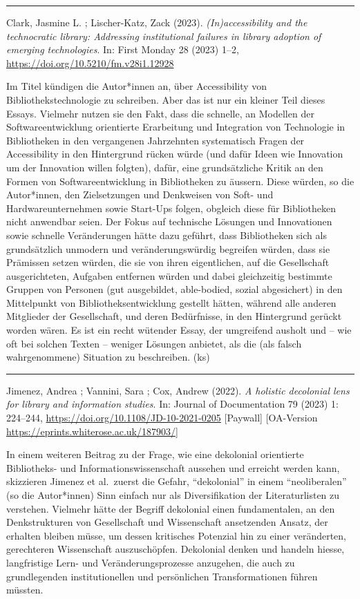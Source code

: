 \documentclass[a4paper,
fontsize=11pt,
oneside,
numbers=noperiodatend,
parskip=half-,
bibliography=totoc,
final
]{scrartcl}
\begin{document}
\begin{center}\rule{0.5\linewidth}{0.5pt}\end{center}

Clark, Jasmine L. ; Lischer-Katz, Zack (2023). \emph{(In)accessibility
and the technocratic library: Addressing institutional failures in
library adoption of emerging technologies}. In: First Monday 28 (2023)
1--2, \url{https://doi.org/10.5210/fm.v28i1.12928}

Im Titel kündigen die Autor*innen an, über Accessibility von
Bibliothekstechnologie zu schreiben. Aber das ist nur ein kleiner Teil
dieses Essays. Vielmehr nutzen sie den Fakt, dass die schnelle, an
Modellen der Softwareentwicklung orientierte Erarbeitung und Integration
von Technologie in Bibliotheken in den vergangenen Jahrzehnten
systematisch Fragen der Accessibility in den Hintergrund rücken würde
(und dafür Ideen wie Innovation um der Innovation willen folgten),
dafür, eine grundsätzliche Kritik an den Formen von Softwareentwicklung
in Bibliotheken zu äussern. Diese würden, so die Autor*innen, den
Zielsetzungen und Denkweisen von Soft- und Hardwareunternehmen sowie
Start-Ups folgen, obgleich diese für Bibliotheken nicht anwendbar seien.
Der Fokus auf technische Lösungen und Innovationen sowie schnelle
Veränderungen hätte dazu geführt, dass Bibliotheken sich als
grundsätzlich unmodern und veränderungswürdig begreifen würden, dass sie
Prämissen setzen würden, die sie von ihren eigentlichen, auf die
Gesellschaft ausgerichteten, Aufgaben entfernen würden und dabei
gleichzeitig bestimmte Gruppen von Personen (gut ausgebildet,
able-bodied, sozial abgesichert) in den Mittelpunkt von
Bibliotheksentwicklung gestellt hätten, während alle anderen Mitglieder
der Gesellschaft, und deren Bedürfnisse, in den Hintergrund gerückt
worden wären. Es ist ein recht wütender Essay, der umgreifend ausholt
und -- wie oft bei solchen Texten -- weniger Lösungen anbietet, als die
(als falsch wahrgenommene) Situation zu beschreiben. (ks)

\begin{center}\rule{0.5\linewidth}{0.5pt}\end{center}

Jimenez, Andrea ; Vannini, Sara ; Cox, Andrew (2022). \emph{A holistic
decolonial lens for library and information studies}. In: Journal of
Documentation 79 (2023) 1: 224--244,
\url{https://doi.org/10.1108/JD-10-2021-0205} {[}Paywall{]}
{[}OA-Version \url{https://eprints.whiterose.ac.uk/187903/}{]}

In einem weiteren Beitrag zu der Frage, wie eine dekolonial orientierte
Bibliotheks- und Informationswissenschaft aussehen und erreicht werden
kann, skizzieren Jimenez et al.~zuerst die Gefahr, \enquote{dekolonial}
in einem \enquote{neoliberalen} (so die Autor*innen) Sinn einfach nur
als Diversifikation der Literaturlisten zu verstehen. Vielmehr hätte der
Begriff dekolonial einen fundamentalen, an den Denkstrukturen von
Gesellschaft und Wissenschaft ansetzenden Ansatz, der erhalten bleiben
müsse, um dessen kritisches Potenzial hin zu einer veränderten,
gerechteren Wissenschaft auszuschöpfen. Dekolonial denken und handeln
hiesse, langfristige Lern- und Veränderungsprozesse anzugehen, die auch
zu grundlegenden institutionellen und persönlichen Transformationen
führen müssten.
\end{document}
